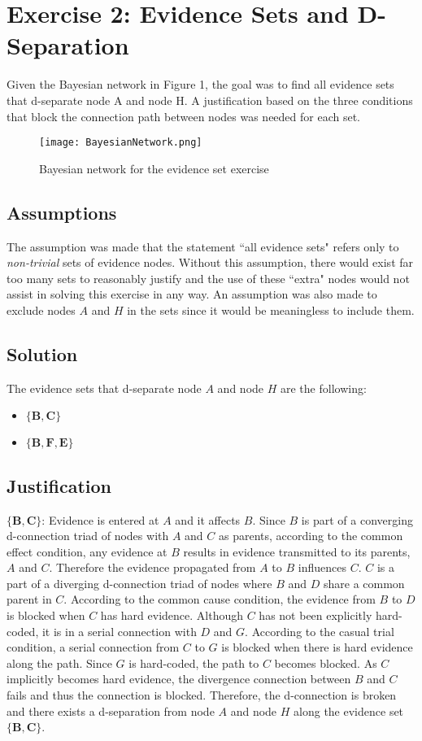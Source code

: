 \documentclass[11pt]{article}
\newcommand{\forceindent}{\leavevmode{\parindent=1em\indent}}
\begin{document}
\section{Exercise 2: Evidence Sets and D-Separation}
\forceindent Given the Bayesian network in Figure 1, the goal was to find all evidence sets that d-separate node A and node H. A justification based on the three conditions that block the connection path between nodes was needed for each set.

\begin{figure}[h!]
  \centering
{\texttt{[image: BayesianNetwork.png]}}
    \caption{Bayesian network for the evidence set exercise}
\end{figure}
\vspace{-0.5cm}
\subsection{Assumptions}
\forceindent The assumption was made that the statement ``all evidence sets" refers only to \emph{non-trivial} sets of evidence nodes. Without this assumption, there would exist far too many sets to reasonably justify and the use of these ``extra" nodes would not assist in solving this exercise in any way. An assumption was also made to exclude nodes $A$ and $H$ in the sets since it would be meaningless to include them.
\subsection{Solution}
The evidence sets that d-separate node $A$ and node $H$ are the following: 
\begin{itemize}
\item $\mathbf{\{B,C\}}$
\item $\mathbf{\{B,F,E\}}$
\end{itemize} 
\subsection{Justification} 
$\mathbf{\{B,C\}}$: Evidence is entered at $A$ and it affects $B$. Since $B$ is part of a converging d-connection triad of nodes with $A$ and $C$ as parents, according to the common effect condition, any evidence at $B$ results in evidence transmitted to its parents, $A$ and $C$. Therefore the evidence propagated from $A$ to $B$ influences $C$. $C$ is a part of a diverging d-connection triad of nodes where $B$ and $D$ share a common parent in $C$. According to the common cause condition, the evidence from $B$ to $D$ is blocked when $C$ has hard evidence. Although $C$ has not been explicitly hard-coded, it is in a serial connection with $D$ and $G$. According to the casual trial condition, a serial connection from $C$ to $G$ is blocked when there is hard evidence along the path. Since $G$ is hard-coded, the path to $C$ becomes blocked. As $C$ implicitly becomes hard evidence, the divergence connection between $B$ and $C$ fails and thus the connection is blocked. Therefore, the d-connection is broken and there exists a d-separation from node $A$ and node $H$ along the evidence set $\mathbf{\{B,C\}}$.  
\end{document}

